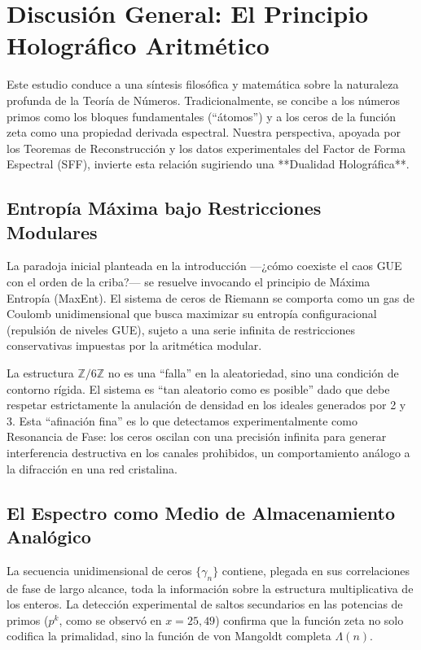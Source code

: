 \documentclass[12pt, a4paper]{article}
\theoremstyle{plain}
\theoremstyle{definition}
\newcommand{\Z}{\mathbb{Z}}
\begin{document}
\section{Discusión General: El Principio Holográfico Aritmético}

Este estudio conduce a una síntesis filosófica y matemática sobre la naturaleza profunda de la Teoría de Números. Tradicionalmente, se concibe a los números primos como los bloques fundamentales (``átomos'') y a los ceros de la función zeta como una propiedad derivada espectral. Nuestra perspectiva, apoyada por los Teoremas de Reconstrucción y los datos experimentales del Factor de Forma Espectral (SFF), invierte esta relación sugiriendo una **Dualidad Holográfica**.

\subsection{Entropía Máxima bajo Restricciones Modulares}

La paradoja inicial planteada en la introducción —¿cómo coexiste el caos GUE con el orden de la criba?— se resuelve invocando el principio de Máxima Entropía (MaxEnt).
El sistema de ceros de Riemann se comporta como un gas de Coulomb unidimensional que busca maximizar su entropía configuracional (repulsión de niveles GUE), sujeto a una serie infinita de restricciones conservativas impuestas por la aritmética modular.

La estructura $\Z/6\Z$ no es una ``falla'' en la aleatoriedad, sino una condición de contorno rígida. El sistema es ``tan aleatorio como es posible'' dado que debe respetar estrictamente la anulación de densidad en los ideales generados por 2 y 3. Esta ``afinación fina'' es lo que detectamos experimentalmente como Resonancia de Fase: los ceros oscilan con una precisión infinita para generar interferencia destructiva en los canales prohibidos, un comportamiento análogo a la difracción en una red cristalina.

\subsection{El Espectro como Medio de Almacenamiento Analógico}

La secuencia unidimensional de ceros $\{\gamma_n\}$ contiene, plegada en sus correlaciones de fase de largo alcance, toda la información sobre la estructura multiplicativa de los enteros. La detección experimental de saltos secundarios en las potencias de primos ($p^k$, como se observó en $x=25, 49$) confirma que la función zeta no solo codifica la primalidad, sino la función de von Mangoldt completa $\Lambda(n)$.
\end{document}
